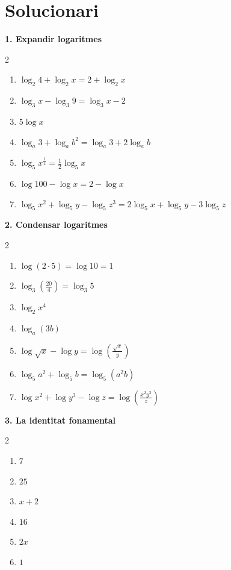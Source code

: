\documentclass[12pt,a4paper]{article}
\begin{document}
\section*{Solucionari}

\textbf{1. Expandir logaritmes}
\begin{multicols}{2}
\begin{enumerate}[label=\alph*)]
    \item $\log_2 4 + \log_2 x = 2 + \log_2 x$
    \item $\log_3 x - \log_3 9 = \log_3 x - 2$
    \item $5 \log x$
    \item $\log_a 3 + \log_a b^2 = \log_a 3 + 2 \log_a b$
    \item $\log_5 x^{\frac{1}{2}} = \frac{1}{2} \log_5 x$ 
    \item $\log 100 - \log x = 2 - \log x$
    \item $\log_5 x^2 + \log_5 y - \log_5 z^3 = 2 \log_5 x + \log_5 y - 3 \log_5 z$
\end{enumerate}
\end{multicols}

\vspace{0.5cm}

\textbf{2. Condensar logaritmes}
\begin{multicols}{2}
\begin{enumerate}[label=\alph*)]
    \item $\log(2 \cdot 5) = \log 10 = 1$
    \item $\log_3 \left(\frac{20}{4}\right) = \log_3 5$
    \item $\log_2 x^4$
    \item $\log_a (3b)$
    \item $\log \sqrt{x} - \log y = \log \left(\frac{\sqrt{x}}{y}\right)$
    \item $\log_5 a^2 + \log_5 b = \log_5(a^2 b)$
    \item $\log x^2 + \log y^3 - \log z = \log \left(\frac{x^2 y^3}{z}\right)$
\end{enumerate}
\end{multicols}

\vspace{0.5cm}

\textbf{3. La identitat fonamental}
\begin{multicols}{2}
\begin{enumerate}[label=\alph*)]
    \item $7$
    \item $25$
    \item $x+2$
    \item $16$
    \item $2x$
    \item $1$
\end{enumerate}
\end{multicols}
\end{document}
